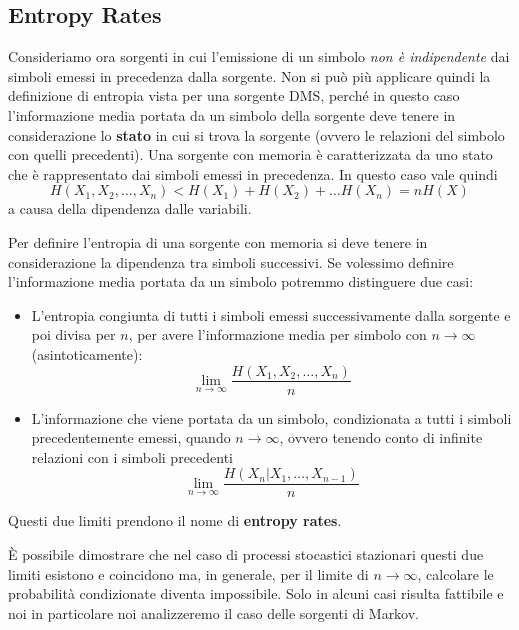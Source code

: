 \subsection{Entropy Rates}
Consideriamo ora sorgenti in cui l’emissione di un simbolo \textit{non è indipendente} dai simboli emessi in
precedenza dalla sorgente. Non si può più applicare quindi la definizione di entropia vista per una sorgente
DMS, perché in questo caso l’informazione media portata da un simbolo della sorgente deve tenere in
considerazione lo \textbf{stato} in cui si trova la sorgente (ovvero le relazioni del simbolo con quelli precedenti).
Una sorgente con memoria è caratterizzata da uno stato che è rappresentato dai simboli emessi in
precedenza. In questo caso vale quindi
\begin{equation}
    H(X_1, X_2, \dots, X_n) < H(X_1) + H(X_2) + \dots H(X_n) = n H(X)
\end{equation}
a causa della dipendenza dalle variabili.

Per definire l’entropia di una sorgente con memoria si deve tenere in considerazione la dipendenza tra simboli
successivi. Se volessimo definire l’informazione media portata da un simbolo potremmo distinguere due casi:
\begin{itemize}
    \item L’entropia congiunta di tutti i simboli emessi successivamente dalla sorgente e poi divisa per $n$, per avere l’informazione media per simbolo con $n \to \infty$ (asintoticamente): 
    \begin{equation}
    \lim_{n \to \infty} \frac{H(X_1, X_2, \dots, X_n)}{n}
    \end{equation}
    \item L’informazione che viene portata da un simbolo, condizionata a tutti i simboli precedentemente
emessi, quando $n \to \infty$, ovvero tenendo conto di infinite relazioni con i simboli precedenti
    \begin{equation}
    \lim_{n \to \infty} \frac{H(X_n|X_1, \dots, X_{n-1})}{n}
    \end{equation}
\end{itemize}
Questi due limiti prendono il nome di \textbf{entropy rates}.

\`E possibile dimostrare che nel caso di processi stocastici stazionari questi due limiti esistono e coincidono ma, in generale, per il limite di $n \to \infty$, calcolare le probabilit\`a condizionate diventa impossibile. Solo in alcuni casi risulta fattibile e noi in particolare noi analizzeremo il caso delle sorgenti di Markov.

